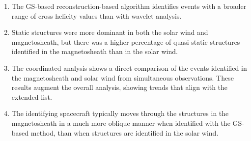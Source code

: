 \begin{enumerate}
    \item The GS-based reconstruction-based algorithm identifies events with a broader range of cross helicity values than with wavelet analysis.
    \item Static structures were more dominant in both the solar wind and magnetosheath, but there was a higher percentage of quasi-static structures identified in the magnetosheath than in the solar wind. %
    \item The coordinated analysis shows a direct comparison of the events identified in the magnetosheath and solar wind from simultaneous observations. These results augment the overall analysis, showing trends that align with the extended list.
    \item The identifying spacecraft typically moves through the structures in the magnetosheath in a much more oblique manner when identified with the GS-based method, than when structures are identified in the solar wind.
\end{enumerate}